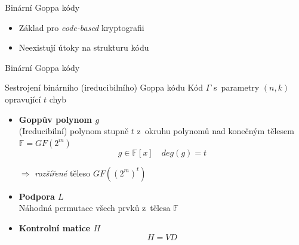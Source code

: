 \documentclass{beamer}
\begin{document}
\begin{frame}{Binární Goppa kódy}
    \begin{itemize}

        \item Základ pro \emph{code-based} kryptografii

            \pause
        \item Neexistují útoky na strukturu kódu

    \end{itemize}
\end{frame}

\begin{frame}{Binární Goppa kódy}

    \begin{block}{Sestrojení binárního (ireducibilního) Goppa kódu}
        Kód $\Gamma$ s~parametry $(n,k)$ opravující $t$ chyb
        \begin{itemize}

                \pause
            \item \textbf{Goppův polynom $g$} \\
                (Ireducibilní) polynom stupně $t$ z~okruhu polynomů nad
                konečným tělesem $\mathbb F = GF(2^m)$
                $$ g \in \mathbb F [x] \quad deg(g) = t $$

                \pause
                $ \Rightarrow $ \emph{rozšířené} těleso $GF((2^m)^t)$

                \pause
            \item \textbf{Podpora $L$} \\
                Náhodná permutace všech prvků z~tělesa $\mathbb F$

                \pause
            \item \textbf{Kontrolní matice $H$}
                $$ H = V D $$

        \end{itemize}
    \end{block}

\end{frame}
\end{document}
